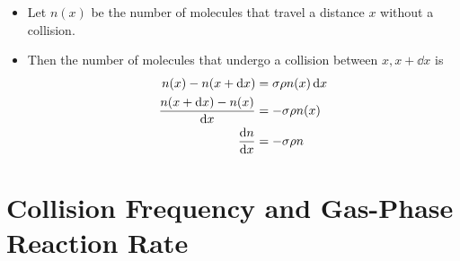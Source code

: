 \documentclass[../notes.tex]{subfiles}
\begin{document}
\begin{itemize}
\begin{itemize}
        \item Let $n(x)$ be the number of molecules that travel a distance $x$ without a collision.
        \item Then the number of molecules that undergo a collision between $x,x+\dd{x}$ is
        \begin{align*}
            n(x)-n(x+\dd{x}) &= \sigma\rho n(x)\dd{x}\\
            \frac{n(x+\dd{x})-n(x)}{\dd{x}} &= -\sigma\rho n(x)\\
            \dv{n}{x} &= -\sigma\rho n
        \end{align*}
    \end{itemize}
\end{itemize}



\section{Collision Frequency and Gas-Phase Reaction Rate}
\end{document}
